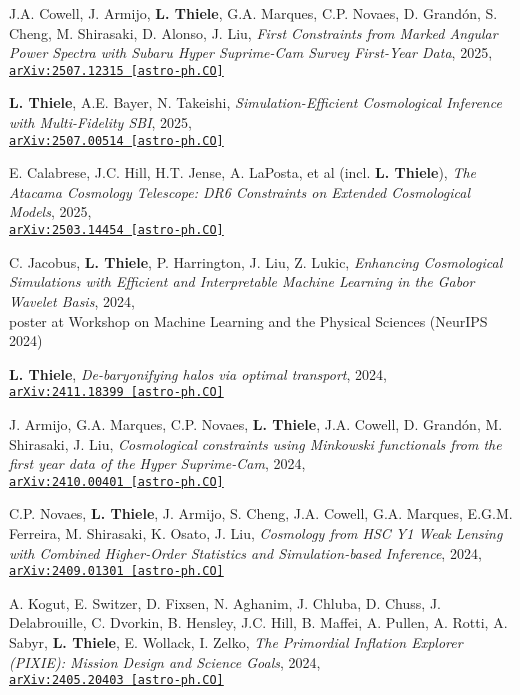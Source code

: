 J.A. Cowell, J. Armijo, {\bf L. Thiele}, G.A. Marques, C.P. Novaes, D. Grand\'on, S. Cheng,
M. Shirasaki, D. Alonso, J. Liu,
\emph{First Constraints from Marked Angular Power Spectra with Subaru Hyper Suprime-Cam Survey First-Year Data}, 2025,\\
\href{https://arxiv.org/abs/2507.12315}{\mbox{\texttt{arXiv:2507.12315 [astro-ph.CO]}}}

{\bf L. Thiele}, A.E. Bayer, N. Takeishi,
\emph{Simulation-Efficient Cosmological Inference with Multi-Fidelity SBI}, 2025,\\
\href{https://arxiv.org/abs/2507.00514}{\mbox{\texttt{arXiv:2507.00514 [astro-ph.CO]}}}

E. Calabrese, J.C. Hill, H.T. Jense, A. LaPosta, et al (incl. {\bf L. Thiele}),
\emph{The Atacama Cosmology Telescope: DR6 Constraints on Extended Cosmological Models}, 2025,\\
\href{http://arxiv.org/abs/2503.14454}{\mbox{\texttt{arXiv:2503.14454 [astro-ph.CO]}}}

C. Jacobus, {\bf L. Thiele}, P. Harrington, J. Liu, Z. Lukic,
\emph{Enhancing Cosmological Simulations with Efficient and Interpretable Machine Learning
in the Gabor Wavelet Basis}, 2024,\\
poster at Workshop on Machine Learning and the Physical Sciences (NeurIPS 2024)

{\bf L. Thiele}, \emph{De-baryonifying halos via optimal transport}, 2024,\\
\href{http://arxiv.org/abs/2411.18399}{\mbox{\texttt{arXiv:2411.18399 [astro-ph.CO]}}}

J. Armijo, G.A. Marques, C.P. Novaes, {\bf L. Thiele}, J.A. Cowell, D. Grand\'on,
M. Shirasaki, J. Liu,
\emph{Cosmological constraints using Minkowski functionals from the first year
data of the Hyper Suprime-Cam}, 2024,\\
\href{https://arxiv.org/abs/2410.00401}{\mbox{\texttt{arXiv:2410.00401 [astro-ph.CO]}}}

C.P. Novaes, {\bf L. Thiele}, J. Armijo, S. Cheng, J.A. Cowell, G.A. Marques, E.G.M. Ferreira,
M. Shirasaki, K. Osato, J. Liu,
\emph{Cosmology from HSC Y1 Weak Lensing with Combined Higher-Order Statistics and
Simulation-based Inference}, 2024,\\
\href{https://arxiv.org/abs/2409.01301}{\mbox{\texttt{arXiv:2409.01301 [astro-ph.CO]}}}

A. Kogut, E. Switzer, D. Fixsen, N. Aghanim, J. Chluba, D. Chuss, J. Delabrouille,
C. Dvorkin, B. Hensley, J.C. Hill, B. Maffei, A. Pullen, A. Rotti, A. Sabyr,
{\bf L. Thiele}, E. Wollack, I. Zelko,
\emph{The Primordial Inflation Explorer (PIXIE): Mission Design and Science Goals}, 2024,\\
\href{https://arxiv.org/abs/2405.20403}{\mbox{\texttt{arXiv:2405.20403 [astro-ph.CO]}}}

